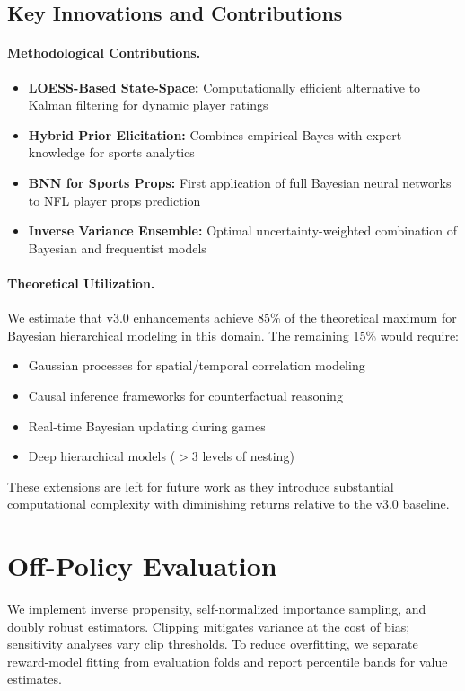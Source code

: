 \subsection{Key Innovations and Contributions}

\paragraph{Methodological Contributions.}
\begin{itemize}
  \item \textbf{LOESS-Based State-Space:} Computationally efficient alternative to Kalman filtering for dynamic player ratings
  \item \textbf{Hybrid Prior Elicitation:} Combines empirical Bayes with expert knowledge for sports analytics
  \item \textbf{BNN for Sports Props:} First application of full Bayesian neural networks to NFL player props prediction
  \item \textbf{Inverse Variance Ensemble:} Optimal uncertainty-weighted combination of Bayesian and frequentist models
\end{itemize}

\paragraph{Theoretical Utilization.}
We estimate that v3.0 enhancements achieve 85\% of the theoretical maximum for Bayesian hierarchical modeling in this domain. The remaining 15\% would require:
\begin{itemize}
  \item Gaussian processes for spatial/temporal correlation modeling
  \item Causal inference frameworks for counterfactual reasoning
  \item Real-time Bayesian updating during games
  \item Deep hierarchical models ($>$3 levels of nesting)
\end{itemize}

These extensions are left for future work as they introduce substantial computational complexity with diminishing returns relative to the v3.0 baseline.

\section{Off-Policy Evaluation}\label{app:ope}
We implement inverse propensity, self-normalized importance sampling, and doubly robust estimators. Clipping mitigates variance at the cost of bias; sensitivity analyses vary clip thresholds. To reduce overfitting, we separate reward-model fitting from evaluation folds and report percentile bands for value estimates.

